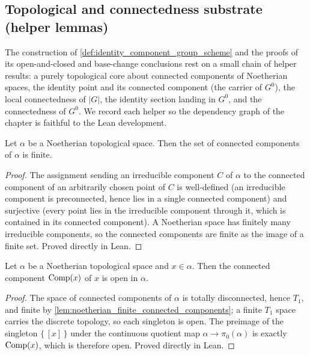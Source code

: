 \subsection{Topological and connectedness substrate (helper lemmas)}
\label{subsec:identity_component_substrate}

The construction of \cref{def:identity_component_group_scheme} and the
proofs of its open-and-closed and base-change conclusions rest on a small
chain of helper results: a purely topological core about connected
components of Noetherian spaces, the identity point and its connected
component (the carrier of \(G^0\)), the local connectedness of \(|G|\), the
identity section landing in \(G^0\), and the connectedness of \(G^0\). We
record each helper so the dependency graph of the chapter is faithful to
the Lean development.

\begin{lemma}
  \label{lem:noetherian_finite_connected_components}
  Let \(\alpha\) be a Noetherian topological space. Then the set of
  connected components of \(\alpha\) is finite.
\end{lemma}
\begin{proof}
  The assignment sending an irreducible component \(C\) of \(\alpha\) to the
  connected component of an arbitrarily chosen point of \(C\) is
  well-defined (an irreducible component is preconnected, hence lies in a
  single connected component) and surjective (every point lies in the
  irreducible component through it, which is contained in its connected
  component). A Noetherian space has finitely many irreducible components,
  so the connected components are finite as the image of a finite set.
  Proved directly in Lean.
\end{proof}

\begin{lemma}\leanok
  \label{lem:noetherian_isopen_connected_component}
  Let \(\alpha\) be a Noetherian topological space and \(x \in \alpha\). Then
  the connected component \(\operatorname{Comp}(x)\) of \(x\) is open in \(\alpha\).
\end{lemma}
\begin{proof}
  The space of connected components of \(\alpha\) is totally disconnected,
  hence \(T_1\), and finite by
  \cref{lem:noetherian_finite_connected_components}; a finite \(T_1\) space
  carries the discrete topology, so each singleton is open. The preimage of
  the singleton \(\{\,[x]\,\}\) under the continuous quotient map
  \(\alpha \to \pi_0(\alpha)\) is exactly \(\operatorname{Comp}(x)\), which is
  therefore open. Proved directly in Lean.
\end{proof}


